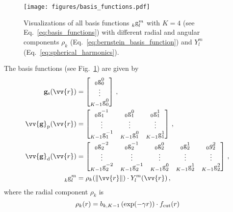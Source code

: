 \documentclass[%
superscriptaddress,
reprint,
nofootinbib,
amsmath,amssymb,amsfonts,
floatfix,
altaffilletter,
showkeys,
]{revtex4-2}
\begin{document}
\begin{figure}
	\texttt{[image: figures/basis\_functions.pdf]}
	\caption{Visualizations of all basis functions $^{\protect\vphantom{0}}_{k}\mathrm{g}_{l}^{m}$ with $K=4$ (see Eq.~\ref{eq:basis_functions}) with different radial and angular components $\rho_k$ (Eq.~\ref{eq:bernstein_basis_function}) and $Y_l^m$ (Eq.~\ref{eq:spherical_harmonics}).}
	\label{fig:basis_functions}
\end{figure}
The basis functions (see Fig.~\ref{fig:basis_functions}) are given by
\begin{equation}
\begin{aligned}
\mathbf{g}_\mathrm{s}(\vv{r}) &= \begin{bmatrix}
^{\vphantom{0}}_{0}\mathrm{g}_{0}^{0}\\
\vdots \\
^{\vphantom{0}}_{K-1}\mathrm{g}_{0}^{0}
\end{bmatrix}\,,\\
\vv{\mathbf{g}}_\mathrm{p}(\vv{r}) &= \begin{bmatrix}
^{\vphantom{0}}_{0}\mathrm{g}_{1}^{-1} & ^{\vphantom{0}}_{0}\mathrm{g}_{1}^{0} & ^{\vphantom{0}}_{0}\mathrm{g}_{1}^{1} \\
\vdots & \vdots & \vdots \\
^{\vphantom{0}}_{K-1}\mathrm{g}_{1}^{-1} & ^{\vphantom{0}}_{K-1}\mathrm{g}_{1}^{0} & ^{\vphantom{0}}_{K-1}\mathrm{g}_{1}^{1}
\end{bmatrix} \,,
\\
\vv{\mathbf{g}}_\mathrm{d}(\vv{r}) &= \begin{bmatrix}
^{\vphantom{0}}_{0}\mathrm{g}_{2}^{-2} & ^{\vphantom{0}}_{0}\mathrm{g}_{2}^{-1} & ^{\vphantom{0}}_{0}\mathrm{g}_{2}^{0} & ^{\vphantom{0}}_{0}\mathrm{g}_{2}^{1} & ^{\vphantom{0}}_{0}g_{2}^{2} \\
\vdots & \vdots & \vdots & \vdots & \vdots \\
^{\vphantom{0}}_{K-1}\mathrm{g}_{2}^{-2} & ^{\vphantom{0}}_{K-1}\mathrm{g}_{2}^{-1} & ^{\vphantom{0}}_{K-1}\mathrm{g}_{2}^{0} & ^{\vphantom{0}}_{K-1}\mathrm{g}_{2}^{1} & ^{\vphantom{0}}_{K-1}\mathrm{g}_{2}^{2}
\end{bmatrix} \,,
\\
^{\vphantom{0}}_{k}\mathrm{g}_{l}^{m} &= \rho_k(\lVert\vv{r}\rVert)\cdot Y_{l}^{m}(\vv{r})\,,
\end{aligned}
\label{eq:basis_functions}
\end{equation}
where the radial component $\rho_k$ is
\begin{equation}
\rho_k(r) = b_{k,K-1}\left(\exp({-\gamma r})\right)\cdot f_{\rm cut}(r)
\label{eq:bernstein_basis_function}
\end{equation}
\end{document}
